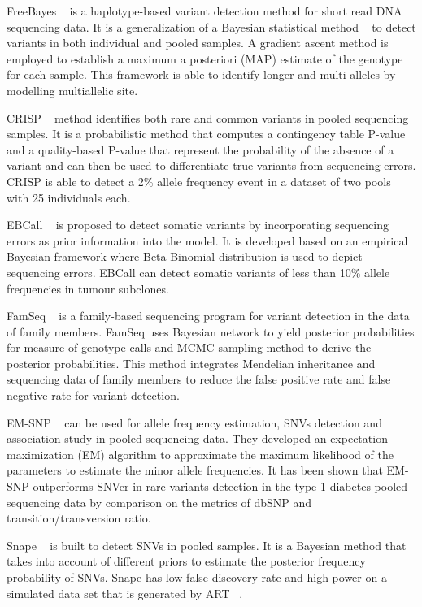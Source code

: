 \documentclass[11pt,reqno]{amsart}
\begin{document}
FreeBayes ~\citep{Garrison2012} is a haplotype-based variant detection method for short read DNA sequencing data.
It is a generalization of a Bayesian statistical method ~\citep{marth1999general} to detect variants in both individual and pooled samples.
A gradient ascent method is employed to establish a maximum a posteriori (MAP) estimate of the genotype for each sample.
This framework is able to identify longer and multi-alleles by modelling multiallelic site.

CRISP ~\citep{Bansal2010} method identifies both rare and common variants in pooled sequencing samples.
It is a probabilistic method that computes a contingency table P-value and a quality-based P-value that represent the probability of the absence of a variant and can then be used to differentiate true variants from sequencing errors.
CRISP is able to detect a 2\% allele frequency event in a dataset of two pools with 25 individuals each.

EBCall ~\citep{Shiraishi2013} is proposed to detect somatic variants by incorporating sequencing errors as prior information into the model.
It is developed based on an empirical Bayesian framework where Beta-Binomial distribution is used to depict sequencing errors.
EBCall can detect somatic variants of less than 10\% allele frequencies in tumour subclones.

FamSeq ~\citep{Peng2013} is a family-based sequencing program for variant detection in the data of family members.
FamSeq uses Bayesian network to yield posterior probabilities for measure of genotype calls and MCMC sampling method to derive the posterior probabilities.
This method integrates Mendelian inheritance and sequencing data of family members to reduce the false positive rate and false negative rate for variant detection.

EM-SNP ~\citep{Chen2013} can be used for allele frequency estimation, SNVs detection and association study in pooled sequencing data.
They developed an expectation maximization (EM) algorithm to approximate the maximum likelihood of the parameters to estimate the minor allele frequencies.
It has been shown that EM-SNP outperforms SNVer in rare variants detection in the type 1 diabetes pooled sequencing data by comparison on the metrics of dbSNP and transition/transversion ratio.

Snape ~\citep{Raineri2012} is built to detect SNVs in pooled samples.
It is a Bayesian method that takes into account of different priors to estimate the posterior frequency probability of SNVs.
Snape has low false discovery rate and high power on a simulated data set that is generated by ART ~\citep{huang2012art}.
\end{document}
